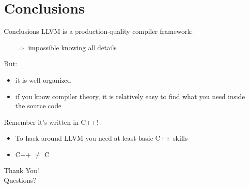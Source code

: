 
\section{Conclusions}


\begin{frame}{Conclusions}
LLVM is a \alert{production-quality} compiler framework:

\begin{itemize}
\item[$\Rightarrow$] impossible knowing all details
\end{itemize}

\vfill
But:

\begin{itemize}
\item it is well organized
\item if you know compiler theory, it is relatively easy to find what you need inside the source code
\end{itemize}

\vfill

Remember it's written in C++! 
\begin{itemize}
\item To hack around LLVM you need at least basic C++ skills
\item C++ $\neq$ C
\end{itemize}
\end{frame}


\begin{frame}[plain]{}
\Huge\centering
Thank You!\\
\bigskip
\normalsize
Questions?
\end{frame}
